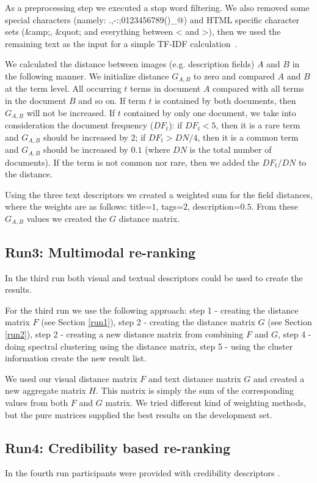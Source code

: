 \documentclass{acm_proc_article-me}
\begin{document}
As a preprocessing step we executed a stop word filtering. We also removed some special characters (namely: .,-:;0123456789()\_@) and HTML specific character sets (\&amp;, \&quot; and everything between < and >), then we used the remaining text as the input for a simple TF-IDF calculation~\cite{Yeh2008}. 

We calculated the distance between images (e.g. description fields) $A$ and $B$ in the following manner. We initialize distance $G_{A,B}$ to zero and compared $A$ and $B$ at the term level. All occurring $t$ terms in document $A$ compared with all terms in the document $B$ and so on. If term $t$ is contained by both documents, then $G_{A,B}$ will not be increased. If $t$ contained by only one document, we take into consideration the document frequency ($DF_t$): if $DF_t<5$, then it is a rare term and $G_{A,B}$ should be increased by $2$; if $DF_t>DN/4$, then it is a common term and  $G_{A,B}$ should be increased by $0.1$ (where $DN$ is the total number of documents). If the term is not common nor rare, then we added the $DF_t/DN$ to the distance. 
 
Using the three text descriptors we created a weighted sum for the field distances, where the weights are as follows: title=$1$, tags=$2$, description=$0.5$. From these $G_{A,B}$ values we created the $G$ distance matrix.

\subsection{Run3: Multimodal re-ranking}
In the third run both visual and textual descriptors could be used to create the results.

For the third run we use the following approach: step 1 - creating the distance matrix $F$ (see Section \ref{run1}), step 2 - creating the distance matrix $G$ (see Section \ref{run2}), step 2 - creating a new distance matrix from combining $F$ and $G$, step 4 - doing spectral clustering using the distance matrix, step 5 - using the cluster information create the new result list.

We used our visual distance matrix $F$ and text distance matrix $G$  and created a new aggregate matrix $H$. This matrix is simply the sum of the corresponding values from both $F$ and $G$ matrix. We tried different kind of weighting methods, but the pure matrices supplied the best results on the development set.

\subsection{Run4: Credibility based re-ranking}
In the fourth run participants were provided with credibility descriptors \cite{Task2015}.
\end{document}
